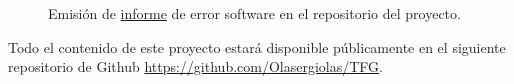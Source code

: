 \begin{figure}[H]
    \caption{Emisión de \href{https://github.com/Olasergiolas/TFG/issues/11}{informe} de error software en el repositorio del proyecto.}
    \label{fig:issue}
\end{figure}

Todo el contenido de este proyecto estará disponible públicamente en el siguiente repositorio de Github \href{https://github.com/Olasergiolas/TFG}{https://github.com/Olasergiolas/TFG}. 
